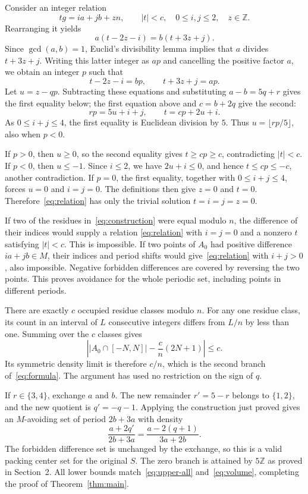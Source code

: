 \documentclass[11pt]{article}
\theoremstyle{remark}
\newcommand{\Z}{\mathbb Z}
\begin{document}
Consider an integer relation
\begin{equation}\label{eq:relation}
 tg=ia+jb+zn,\qquad |t|<c,\quad 0\le i,j\le2,\quad z\in\Z.
\end{equation}
Rearranging it yields
\[
 a(t-2z-i)=b(t+3z+j).
\]
Since \(\gcd(a,b)=1\), Euclid's divisibility lemma implies that
\(a\) divides \(t+3z+j\). Writing this latter integer as \(ap\)
and cancelling the positive factor \(a\), we obtain an integer
\(p\) such that
\[
 t-2z-i=bp,\qquad t+3z+j=ap.
\]
Let \(u=z-qp\). Subtracting these equations and substituting
\(a-b=5q+r\) gives the first equality below; the first equation
above and \(c=b+2q\) give the second:
\begin{equation}\label{eq:division-relation}
 rp=5u+i+j,\qquad t=cp+2u+i.
\end{equation}
As \(0\le i+j\le4\), the first equality is Euclidean division by
\(5\). Thus \(u=\lfloor rp/5\rfloor\), also when \(p<0\).

If \(p>0\), then \(u\ge0\), so the second equality gives
\(t\ge cp\ge c\), contradicting \(|t|<c\).
If \(p<0\), then \(u\le-1\). Since \(i\le2\), we have
\(2u+i\le0\), and hence \(t\le cp\le-c\), another
contradiction. If \(p=0\), the first equality, together with
\(0\le i+j\le4\), forces \(u=0\) and \(i=j=0\). The definitions
then give \(z=0\) and \(t=0\). Therefore~\eqref{eq:relation} has
only the trivial solution \(t=i=j=z=0\).

If two of the residues in~\eqref{eq:construction} were equal modulo
\(n\), the difference of their indices would supply a relation
\eqref{eq:relation} with \(i=j=0\) and a nonzero \(t\) satisfying
\(|t|<c\). This is impossible. If two points of \(A_0\) had
positive difference \(ia+jb\in M\), their indices and period
shifts would give~\eqref{eq:relation} with \(i+j>0\), also
impossible. Negative forbidden differences are covered by reversing
the two points. This proves avoidance for the whole periodic set,
including points in different periods.

There are exactly \(c\) occupied residue classes modulo \(n\).
For any one residue class, its count in an interval of \(L\)
consecutive integers differs from \(L/n\) by less than one. Summing
over the \(c\) classes gives
\[
 \left||A_0\cap[-N,N]|-\frac{c}{n}(2N+1)\right|\le c.
\]
Its symmetric density limit is therefore \(c/n\), which is the
second branch of~\eqref{eq:formula}. The argument has used no
restriction on the sign of \(q\).

If \(r\in\{3,4\}\), exchange \(a\) and \(b\). The new remainder
\(r'=5-r\) belongs to \(\{1,2\}\), and the new quotient is
\(q'=-q-1\). Applying the construction just proved gives an
\(M\)-avoiding set of period \(2b+3a\) with density
\[
 \frac{a+2q'}{2b+3a}=
 \frac{a-2(q+1)}{3a+2b}.
\]
The forbidden difference set is unchanged by the exchange, so this is
a valid packing center set for the original \(S\). The zero branch
is attained by \(5\Z\) as proved in Section~2. All lower bounds
match~\eqref{eq:upper-all} and~\eqref{eq:volume}, completing the
proof of Theorem~\ref{thm:main}.
\end{document}
